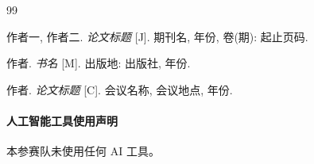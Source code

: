 \begin{thebibliography}{99}

作者一, 作者二.
\emph{论文标题} [J].
期刊名, 年份, 卷(期): 起止页码.

作者.
\emph{书名} [M].
出版地: 出版社, 年份.

作者.
\emph{论文标题} [C].
会议名称, 会议地点, 年份.

%
%

\end{thebibliography}

\paragraph*{人工智能工具使用声明}
本参赛队未使用任何 AI 工具。
